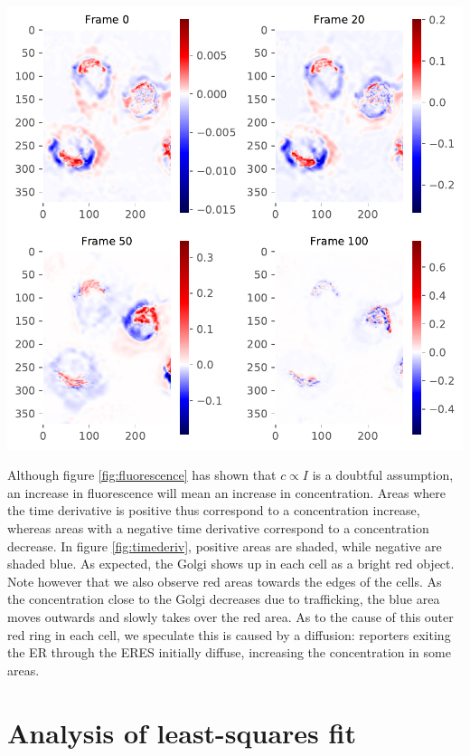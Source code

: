 \documentclass{Dissertate}
\let\origfigure\figure
\let\endorigfigure\endfigure
\renewenvironment{figure}[1][2] {
    \expandafter\origfigure\expandafter[H]
} {
    \endorigfigure
}
\begin{document}
\begin{figure}
\hypertarget{fig:timederiv}{%
\centering
\includegraphics{source/figures/pdf/time_deriv.pdf}
\caption{The determined time derivative four different frames of the
ManII RUSH experiments.}\label{fig:timederiv}
}
\end{figure}

Although figure \ref{fig:fluorescence} has shown that $c\propto I$ is a doubtful assumption, an increase in fluorescence will mean an increase in concentration. Areas where the time derivative is positive thus correspond to a concentration increase, whereas areas with a negative time derivative correspond to a concentration decrease. In figure \ref{fig:timederiv}, positive areas are shaded, while negative are shaded blue. As expected, the Golgi shows up in each
cell as a bright red object. Note however that we also observe red areas
towards the edges of the cells. As the concentration close to the Golgi
decreases due to trafficking, the blue area moves outwards and slowly takes over the red area. As to the cause of this outer red ring in each cell, we speculate this is caused by a diffusion: reporters exiting the ER through the ERES initially diffuse, increasing the concentration in some areas. 

\hypertarget{analysis-of-ls-fit}{%
\section{Analysis of least-squares fit}\label{analysis-of-ls-fit}}
\end{document}
